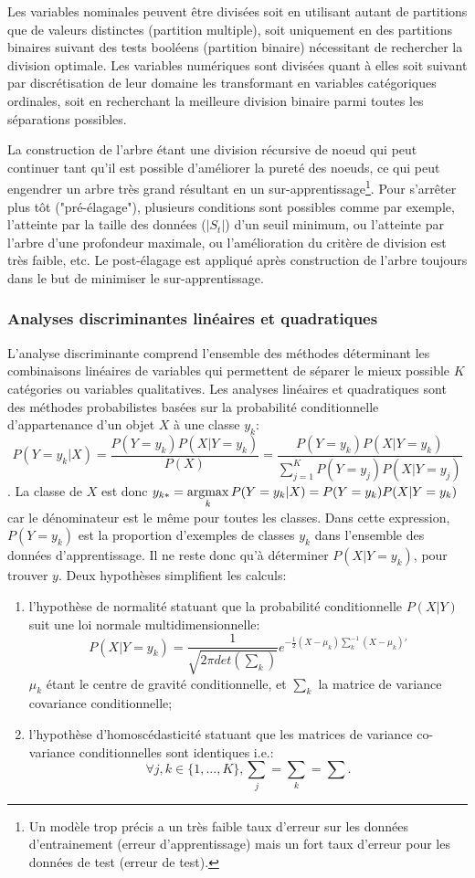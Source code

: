 Les variables nominales peuvent être divisées soit en utilisant autant de partitions que de valeurs distinctes (partition multiple), soit uniquement en des partitions binaires suivant des tests booléens (partition binaire) nécessitant de rechercher la division optimale. Les variables numériques sont divisées quant à elles soit suivant par discrétisation de leur domaine les transformant en variables catégoriques ordinales, soit en recherchant la meilleure division binaire parmi  toutes les séparations possibles. 

La construction de l'arbre étant une division récursive de noeud qui peut continuer tant qu'il est possible d'améliorer la pureté des noeuds, ce qui peut engendrer un arbre très grand résultant en un sur-apprentissage\footnote{Un modèle trop précis a un très faible taux d'erreur sur les données d'entrainement (erreur d'apprentissage) mais un fort taux d'erreur pour les données de test (erreur de test).}. Pour s'arrêter plus tôt ("pré-élagage"), plusieurs conditions sont possibles comme par exemple, l'atteinte par la taille des données ($\vert S_t \vert$) d'un seuil minimum, ou l'atteinte par l'arbre d'une profondeur maximale, ou l'amélioration du critère de division est très faible, etc. Le post-élagage est appliqué après construction de l'arbre toujours dans le but de minimiser le sur-apprentissage.

\subsubsection{Analyses discriminantes linéaires et quadratiques}

L'analyse discriminante comprend l'ensemble des méthodes déterminant les combinaisons linéaires de variables qui permettent de séparer le mieux possible $K$ catégories ou variables qualitatives. Les analyses linéaires et quadratiques sont des méthodes probabilistes basées sur la probabilité conditionnelle d'appartenance d'un objet $X$ à une classe $y_k$: \[P(Y=y_k \vert X) = \frac{P(Y=y_k) P(X \vert Y=y_k)}{P(X)} = \frac{P(Y=y_k) P(X \vert Y=y_k)}{\sum\limits_{j = 1}^K P(Y=y_j) P(X \vert Y=y_j)}\].
La classe de $X$ est donc $y_{k*} = \mathop{\mathrm{argmax}}\limits_k P(Y=y_k \vert X) = P(Y=y_k) P(X \vert Y=y_k)$ car le dénominateur est le même pour toutes les classes. Dans cette expression, $P(Y=y_k)$ est la proportion d'exemples de classes $y_k$ dans l'ensemble des données d'apprentissage. Il ne reste donc qu'à déterminer $P(X \vert Y=y_k)$, pour trouver $y$. Deux hypothèses simplifient les calculs:
\begin{enumerate}
	\item l'hypothèse de normalité statuant que la probabilité conditionnelle $P(X \vert Y)$ suit une loi normale multidimensionnelle: \[P(X \vert Y = y_k) = \frac{1}{\sqrt{2\pi det(\sum_k)}}e^{-\frac{1}{2}(X - \mu_k)\sum_k^{-1}(X - \mu_k)'} \] $\mu_k$ étant le centre de gravité conditionnelle, et $\sum_k$ la matrice de variance covariance conditionnelle;
	\item l'hypothèse d'homoscédasticité statuant que les matrices de variance co-variance conditionnelles sont identiques i.e.: \[\forall j,k \in \lbrace 1,...,K \rbrace, \sum_j = \sum_k = \sum.\]
\end{enumerate}

